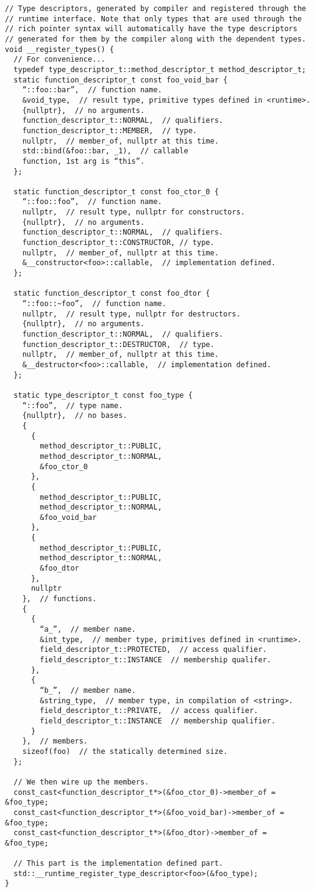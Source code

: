 \documentclass[10pt,a4paper]{article}
\begin{document}
\begin{verbatim}
// Type descriptors, generated by compiler and registered through the
// runtime interface. Note that only types that are used through the
// rich pointer syntax will automatically have the type descriptors
// generated for them by the compiler along with the dependent types.
void __register_types() {
  // For convenience...
  typedef type_descriptor_t::method_descriptor_t method_descriptor_t;
  static function_descriptor_t const foo_void_bar {
    “::foo::bar”,  // function name.
    &void_type,  // result type, primitive types defined in <runtime>.
    {nullptr},  // no arguments.
    function_descriptor_t::NORMAL,  // qualifiers.
    function_descriptor_t::MEMBER,  // type.
    nullptr,  // member_of, nullptr at this time.
    std::bind(&foo::bar, _1),  // callable
    function, 1st arg is “this”.
  };

  static function_descriptor_t const foo_ctor_0 {
    “::foo::foo”,  // function name.
    nullptr,  // result type, nullptr for constructors.
    {nullptr},  // no arguments.
    function_descriptor_t::NORMAL,  // qualifiers.
    function_descriptor_t::CONSTRUCTOR, // type.
    nullptr,  // member_of, nullptr at this time.
    &__constructor<foo>::callable,  // implementation defined.
  };

  static function_descriptor_t const foo_dtor {
    “::foo::~foo”,  // function name.
    nullptr,  // result type, nullptr for destructors.
    {nullptr},  // no arguments.
    function_descriptor_t::NORMAL,  // qualifiers.
    function_descriptor_t::DESTRUCTOR,  // type.
    nullptr,  // member_of, nullptr at this time.
    &__destructor<foo>::callable,  // implementation defined.
  };

  static type_descriptor_t const foo_type {
    “::foo”,  // type name.
    {nullptr},  // no bases.
    {
      {
        method_descriptor_t::PUBLIC,
        method_descriptor_t::NORMAL,
        &foo_ctor_0
      },
      {
        method_descriptor_t::PUBLIC,
        method_descriptor_t::NORMAL,
        &foo_void_bar
      }, 
      {
        method_descriptor_t::PUBLIC,
        method_descriptor_t::NORMAL,
        &foo_dtor
      },
      nullptr
    },  // functions.
    {
      {
        “a_”,  // member name.
        &int_type,  // member type, primitives defined in <runtime>.
        field_descriptor_t::PROTECTED,  // access qualifier.
        field_descriptor_t::INSTANCE  // membership qualifer.
      },
      {
        “b_”,  // member name.
        &string_type,  // member type, in compilation of <string>.
        field_descriptor_t::PRIVATE,  // access qualifier.
        field_descriptor_t::INSTANCE  // membership qualifier.
      }
    },  // members.
    sizeof(foo)  // the statically determined size.
  };

  // We then wire up the members.
  const_cast<function_descriptor_t*>(&foo_ctor_0)->member_of = &foo_type;
  const_cast<function_descriptor_t*>(&foo_void_bar)->member_of = &foo_type;
  const_cast<function_descriptor_t*>(&foo_dtor)->member_of = &foo_type;

  // This part is the implementation defined part.
  std::__runtime_register_type_descriptor<foo>(&foo_type);
}
\end{verbatim}
\end{document}
